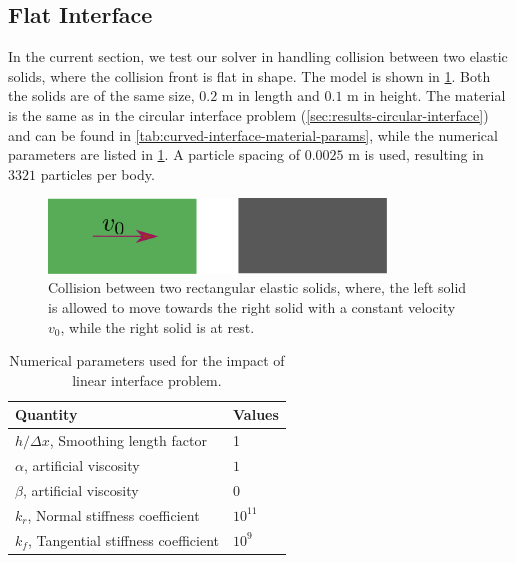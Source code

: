 \subsection{Flat Interface}
\label{sec:results-linear-interface}
In the current section, we test our solver in handling collision between two
elastic solids, where the collision front is flat in shape. The model is
shown in \cref{fig:results-yan-linear-interface-schematic}. Both the solids
are of the same size, $0.2$ m in length and $0.1$ m in height. The material is
the same as in the circular interface problem
(\cref{sec:results-circular-interface}) and can be found in
\cref{tab:curved-interface-material-params}, while the numerical parameters
are listed in \cref{tab:linear-interface-numerical-params}. A particle spacing
of $0.0025$ m is used, resulting in $3321$ particles per body.
\begin{figure}[!htpb]
  \centering
  \includegraphics[width=0.8\textwidth]{images/csph/images/yan_2021_linear_interface/schematic}
  \caption{
    Collision between two rectangular elastic solids, where, the left solid is allowed
    to move towards the right solid with a constant velocity $v_0$, while the right
    solid is at rest.}
\label{fig:results-yan-linear-interface-schematic}
\end{figure}
\begin{table}[!ht]
  \centering
  \begin{tabular}[!ht]{ll}
    \toprule
    Quantity & Values\\
    \midrule
    $h/\Delta x$, Smoothing length factor & 1\\
    $\alpha$, artificial viscosity & $1$ \\
    $\beta$, artificial viscosity & $0$ \\
    $k_r$, Normal stiffness coefficient & $10^{11}$ \\
    $k_f$, Tangential stiffness coefficient & $10^{9}$ \\
    \bottomrule
  \end{tabular}
  \caption{Numerical parameters used for the impact of linear interface problem.}%
  \label{tab:linear-interface-numerical-params}
\end{table}

